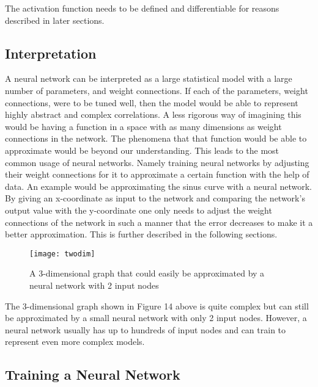 \documentclass[titlepage]{article}
\begin{document}
\vskip 0.2cm

\noindent
The activation function needs to be defined and differentiable for reasons described in later sections.

\newpage

\subsection{Interpretation}

\vskip 0.2cm

A neural network can be interpreted as a large statistical model with a large number of parameters, and weight connections. If each of the parameters, weight connections, were to be tuned well, then the model would be able to represent highly abstract and complex correlations. A less rigorous way of imagining this would be having a function in a space with as many dimensions as weight connections in the network. The phenomena that that function would be able to approximate would be beyond our understanding. This leads to the most common usage of neural networks. Namely training neural networks by adjusting their weight connections for it to approximate a certain function with the help of data. An example would be approximating the sinus curve with a neural network. By giving an x-coordinate as input to the network and comparing the network's output value with the y-coordinate one only needs to adjust the weight connections of the network in such a manner that the error decreases to make it a better approximation. This is further described in the following sections.

\vskip 0.5cm

\begin{figure}[h]
    \center
    \texttt{[image: twodim]}
    \vskip 0.3cm
    \caption{A 3-dimensional graph that could easily be approximated by a neural network with 2 input nodes}
\end{figure}

\vskip 0.2cm

\noindent
The 3-dimensional graph shown in Figure 14 above is quite complex but can still be approximated by a small neural network with only 2 input nodes. However, a neural network usually has up to hundreds of input nodes and can train to represent even more complex models.

\newpage

\subsection{Training a Neural Network}
\end{document}
